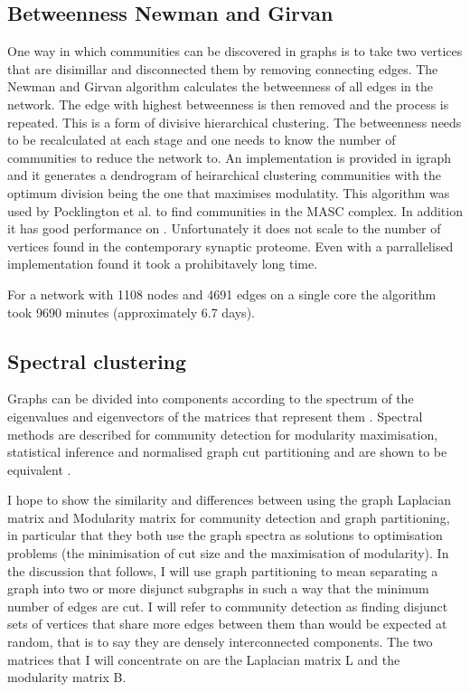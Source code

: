 \subsection{Betweenness Newman and Girvan}
One way in which communities can be discovered in graphs is to take two vertices that are
disimillar and disconnected them by removing connecting edges.
The Newman and Girvan algorithm \cite{newman2004finding}  calculates the betweenness
of all edges in the network. The edge with highest betweenness is then removed and the
process is repeated. This is a form of divisive hierarchical clustering. The betweenness
needs to be recalculated at each stage and one needs to know the number of communities
to reduce the network to. An implementation is provided in igraph and it generates a dendrogram of heirarchical clustering communities with the optimum division being the one that maximises modulatity. This algorithm was used by Pocklington et al. \cite{pocklington2006proteomes} to find
communities in the MASC complex. In addition it has good performance on . Unfortunately it does not scale to the number of
vertices found in the contemporary synaptic proteome. Even with a parrallelised implementation found it took a prohibitavely long time. 

For a network with 1108 nodes and 4691 edges on a single core the algorithm took 9690 minutes (approximately 6.7 days). \cite{mclean2016improved}




\subsection{Spectral clustering}
Graphs can be divided into components according to the spectrum of the eigenvalues and
eigenvectors of the matrices that represent them \cite{newman2006finding}. Spectral methods are described for community detection for modularity maximisation, statistical inference and normalised graph cut partitioning and are shown to be equivalent \cite{newman2013spectral}.

I hope to show the similarity and differences between using the graph Laplacian matrix
and Modularity matrix for community detection and graph partitioning, in particular that
they both use the graph spectra as solutions to optimisation problems (the minimisation
of cut size and the maximisation of modularity).
In the discussion that follows, I will use graph partitioning to mean separating a graph
into two or more disjunct subgraphs in such a way that the minimum number of edges are
cut. I will refer to community detection as finding disjunct sets of vertices that share more
edges between them than would be expected at random, that is to say they are densely
interconnected components.
The two matrices that I will concentrate on are the Laplacian matrix L and the modularity
matrix B.

